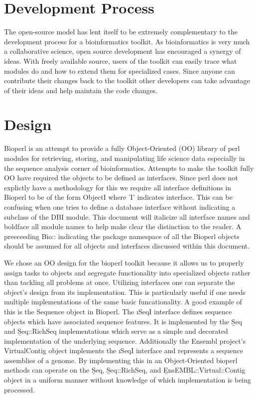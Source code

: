 \documentclass{article}
\begin{document}
\begin{twocolumn}
\section{Development Process}

The open-source model has lent itself to be extremely complementary to
the development process for a bioinformatics toolkit.  As
bioinformatics is very much a collaborative science, open source
development has encouraged a synergy of ideas.  With freely available
source, users of the toolkit can easily trace what modules do and how
to extend them for specialized cases.  Since anyone can contribute
their changes back to the toolkit other developers can take advantage
of their ideas and help maintain the code changes. 

\section{Design}

Bioperl is an attempt to provide a fully Object-Oriented (OO) library of
perl modules for retrieving, storing, and manipulating life science
data especially in the sequence analysis corner of bioinformatics.
Attempts to make the toolkit fully OO have required the objects to be
defined as interfaces.  Since perl does not explictly have a
methodology for this we require all interface definitions in Bioperl
to be of the form ObjectI where 'I' indicates interface.  This can be
confusing when one tries to define a database interface without
indicating a subclass of the DBI module.  This document will italicize
all interface names and boldface all module names to help make clear
the distinction to the reader.  A preeceeding Bio:: indicating the
package namespace of all the Bioperl objects should be assumed for all
objects and interfaces discussed within this document.  
  
\par

We chose an OO design for the bioperl toolkit because it allows us to
properly assign tasks to objects and segregate functionality into
specialized objects rather than tackling all problems at once.
Utilizing interfaces one can separate the object's design from its
implementation.  This is particularly useful if one needs multiple
implementations of the same basic funcationality.  A good example of
this is the Sequence object in Bioperl. The \i{SeqI} interface
defines sequence objects which have associated sequence features.  It
is implemented by the \b{Seq} and \b{Seq::RichSeq} implementations
which serve as a simple and decorated implementation of the underlying
sequence.  Additionally the Ensembl project's VirtualContig object
implements the \i{SeqI} interface and represents a sequence
assemblies of a genome.  By implementing this in an Object-Oriented
bioperl methods can operate on the \b{Seq}, \b{Seq::RichSeq}, and
\b{EnsEMBL::Virtual::Contig} object in a uniform manner without
knowledge of which implementation is being processed.


\end{twocolumn}
\end{document}

